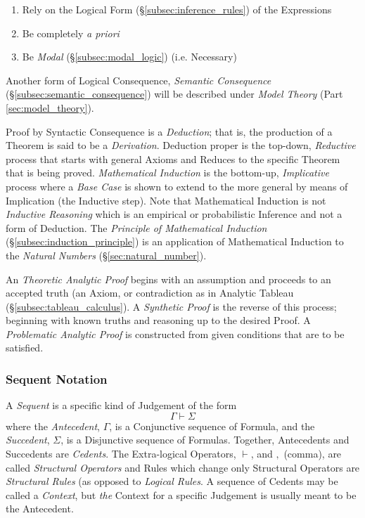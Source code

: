 \documentclass{article}
\begin{document}
\begin{enumerate}
\item Rely on the Logical Form (\S\ref{subsec:inference_rules}) of the
  Expressions
\item Be completely \emph{a priori}
\item Be \emph{Modal} (\S\ref{subsec:modal_logic}) (i.e. Necessary)
\end{enumerate}
Another form of Logical Consequence, \emph{Semantic Consequence}
(\S\ref{subsec:semantic_consequence}) will be described under
\emph{Model Theory} (Part \ref{sec:model_theory}).

Proof by Syntactic Consequence is a \emph{Deduction}; that is, the
production of a Theorem is said to be a \emph{Derivation}. Deduction
proper is the top-down, \emph{Reductive} process that starts with
general Axioms and Reduces to the specific Theorem that is being
proved. \emph{Mathematical Induction} is the bottom-up,
\emph{Implicative} process where a \emph{Base Case} is shown to extend
to the more general by means of Implication (the Inductive step). Note
that Mathematical Induction is not \emph{Inductive Reasoning} which is
an empirical or probabilistic Inference and not a form of Deduction.
The \emph{Principle of Mathematical Induction}
(\S\ref{subsec:induction_principle}) is an application of Mathematical
Induction to the \emph{Natural Numbers}
(\S\ref{sec:natural_number}).

An \emph{Theoretic Analytic Proof} begins with an assumption and
proceeds to an accepted truth (an Axiom, or contradiction as in
Analytic Tableau (\S\ref{subsec:tableau_calculus}). A \emph{Synthetic
  Proof} is the reverse of this process; beginning with known truths
and reasoning up to the desired Proof. A \emph{Problematic Analytic
  Proof} is constructed from given conditions that are to be
satisfied.

\subsubsection{Sequent Notation}\label{subsec:sequent_notation}

A \emph{Sequent} is a specific kind of Judgement of the form
\[\Gamma \vdash \Sigma \]
where the \emph{Antecedent}, $\Gamma$, is a Conjunctive sequence of
Formula, and the \emph{Succedent}, $\Sigma$, is a Disjunctive sequence
of Formulas. Together, Antecedents and Succedents are
\emph{Cedents}. The Extra-logical Operators, $\vdash$, and $,$
(comma), are called \emph{Structural Operators} and Rules which change
only Structural Operators are \emph{Structural Rules} (as opposed to
\emph{Logical Rules}. A sequence of Cedents may be called a
\emph{Context}, but \emph{the} Context for a specific Judgement is
usually meant to be the Antecedent.
\end{document}
